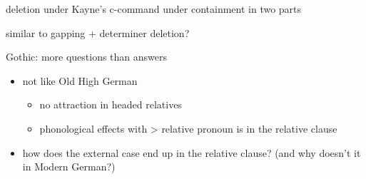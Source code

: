 \documentclass[12pt]{beamer}
\begin{document}
\begin{frame}

  deletion under Kayne's c-command under containment in two parts

  similar to gapping + determiner deletion?



\end{frame}




\begin{frame}{Gothic: more questions than answers}

\begin{itemize}
  \item not like Old High German
    \begin{itemize}
      \item no attraction in headed relatives \citep{harbert1992}
      \item phonological effects with  > relative pronoun is in the relative clause \citep{harbert1992}
    \end{itemize}
  \item how does the external case end up in the relative clause? (and why doesn't it in Modern German?)
\end{itemize}

\end{frame}



%
%
%
%
%
\end{document}
